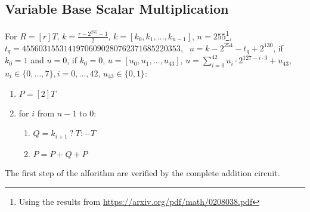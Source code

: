 \subsection{Variable Base Scalar Multiplication}
For $R  = [r]T$, $k = \frac{r - 2^{255} - 1}{2}$, $k = [k_0, k_1, \dots, k_{n - 1}]$, $n = 255$\footnote{Using the results from \url{https://arxiv.org/pdf/math/0208038.pdf}}, \\$t_q = 45560315531419706090280762371685220353$,
$~~u=k- 2^{254} - t_q+2^{130}$, if $k_0 = 1$ and $u = 0$, if $k_0 = 0$, $u = [u_0, u_1, \dots, u_{43}]$, $u=\sum_{i=0}^{42}u_i\cdot 2^{127-i \cdot 3} + u_{43}$, $u_i \in \{0,\dots, 7\}, i=0,\dots, 42$, $u_{43} \in \{0,1\}$:
\begin{enumerate}
    \item $P = [2]T$
    \item for $i$ from $n - 1$ to $0$:
    \begin{enumerate}
        \item $Q = k_{i + 1} \: ? \: T : -T$
        \item $P = P + Q + P$
    \end{enumerate}
\end{enumerate}

The first step of the alforithm are verified by the complete addition circuit. 

